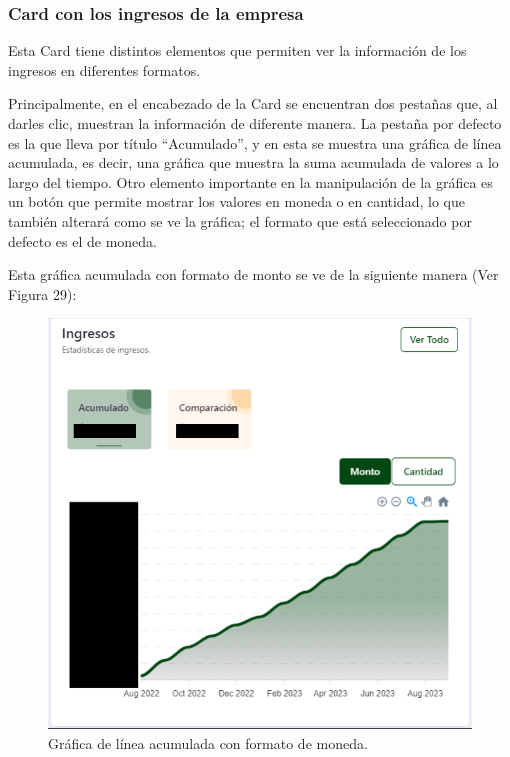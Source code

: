 \subsubsection{Card con los ingresos de la empresa}
Esta Card tiene distintos elementos que permiten ver la información de los ingresos en diferentes formatos.

Principalmente, en el encabezado de la Card se encuentran dos pestañas que, al darles clic, muestran la información de diferente manera. La pestaña por defecto es la que lleva por título ``Acumulado'', y en esta se muestra una gráfica de línea acumulada, es decir, una gráfica que muestra la suma acumulada de valores a lo largo del tiempo. Otro elemento importante en la manipulación de la gráfica es un botón que permite mostrar los valores en moneda o en cantidad, lo que también alterará como se ve la gráfica; el formato que está seleccionado por defecto es el de moneda.

Esta gráfica acumulada con formato de monto se ve de la siguiente manera (Ver Figura 29): 

    \begin{figure}[H]
        \begin{center}
            \includegraphics[scale=0.29]{img/actividades/dahsboard-admin/ingreso-acumulado-monto.png}
            \caption{Gráfica de línea acumulada con formato de moneda.}
            \label{fig:ingreso-acumulado-monto}
        \end{center}
    \end{figure}

